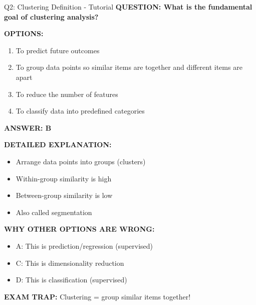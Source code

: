 \documentclass[8pt]{beamer}
\begin{document}
	\begin{frame}{Q2: Clustering Definition - Tutorial}
		\fontsize{6.5}{7.5}\selectfont
		\textbf{QUESTION: What is the fundamental goal of clustering analysis?}
		
		\vspace{0.1cm}
		\textbf{OPTIONS:}
		\begin{enumerate}
			\item To predict future outcomes
			\item To group data points so similar items are together and different items are apart
			\item To reduce the number of features
			\item To classify data into predefined categories
		\end{enumerate}
		
		\vspace{0.1cm}
		\textcolor{myblue}{\textbf{ANSWER: B}}
		
		\vspace{0.1cm}
		\textbf{DETAILED EXPLANATION:}
		\begin{itemize}
			\item Arrange data points into groups (clusters)
			\item Within-group similarity is high
			\item Between-group similarity is low
			\item Also called segmentation
		\end{itemize}
		
		\vspace{0.1cm}
		\textcolor{myred}{\textbf{WHY OTHER OPTIONS ARE WRONG:}}
		\begin{itemize}
			\item \textcolor{myred}{A:} This is prediction/regression (supervised)
			\item \textcolor{myred}{C:} This is dimensionality reduction
			\item \textcolor{myred}{D:} This is classification (supervised)
		\end{itemize}
		
		\textcolor{myred}{\textbf{EXAM TRAP:}} Clustering = \textcolor{myblue}{group similar items together}! 
	\end{frame}
	
\end{document}
